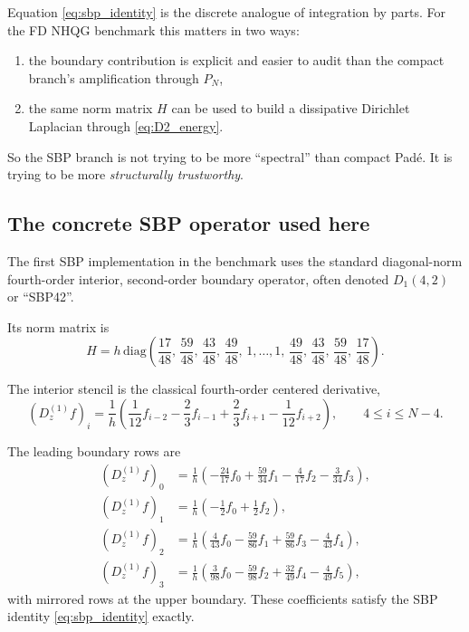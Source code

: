 \documentclass[11pt]{article}
\newcommand{\Dzone}{D^{(1)}_z}
\newcommand{\Hmat}{H}
\newcommand{\Pmat}{P_N}
\begin{document}
Equation \eqref{eq:sbp_identity} is the discrete analogue of integration by
parts. For the FD NHQG benchmark this matters in two ways:
\begin{enumerate}[nosep]
\item the boundary contribution is explicit and easier to audit than the
  compact branch's amplification through $\Pmat$,
\item the same norm matrix $\Hmat$ can be used to build a dissipative Dirichlet
  Laplacian through \eqref{eq:D2_energy}.
\end{enumerate}

So the SBP branch is not trying to be more ``spectral'' than compact Pad\'e.
It is trying to be more \emph{structurally trustworthy}.

\subsection{The concrete SBP operator used here}

The first SBP implementation in the benchmark uses the standard diagonal-norm
fourth-order interior, second-order boundary operator, often denoted
$D_1(4,2)$ or ``SBP42''.

Its norm matrix is
\begin{equation}
\boxed{
\Hmat = h\,\mathrm{diag}\!\left(
\frac{17}{48},\,
\frac{59}{48},\,
\frac{43}{48},\,
\frac{49}{48},\,
1,\dots,1,\,
\frac{49}{48},\,
\frac{43}{48},\,
\frac{59}{48},\,
\frac{17}{48}
\right).
}
\label{eq:sbp42_H}
\end{equation}

The interior stencil is the classical fourth-order centered derivative,
\begin{equation}
\boxed{
(\Dzone f)_i
=
\frac{1}{h}\left(
\frac{1}{12} f_{i-2}
- \frac{2}{3} f_{i-1}
+ \frac{2}{3} f_{i+1}
- \frac{1}{12} f_{i+2}
\right),
\qquad 4 \le i \le N-4.
}
\label{eq:sbp42_interior}
\end{equation}

The leading boundary rows are
\begin{align}
(\Dzone f)_0 &=
\frac{1}{h}\left(
-\frac{24}{17} f_0
+\frac{59}{34} f_1
-\frac{4}{17} f_2
-\frac{3}{34} f_3
\right),
\\
(\Dzone f)_1 &=
\frac{1}{h}\left(
-\frac{1}{2} f_0
+\frac{1}{2} f_2
\right),
\\
(\Dzone f)_2 &=
\frac{1}{h}\left(
\frac{4}{43} f_0
-\frac{59}{86} f_1
+\frac{59}{86} f_3
-\frac{4}{43} f_4
\right),
\\
(\Dzone f)_3 &=
\frac{1}{h}\left(
\frac{3}{98} f_0
-\frac{59}{98} f_2
+\frac{32}{49} f_4
-\frac{4}{49} f_5
\right),
\end{align}
with mirrored rows at the upper boundary. These coefficients satisfy the SBP
identity \eqref{eq:sbp_identity} exactly.
\end{document}
